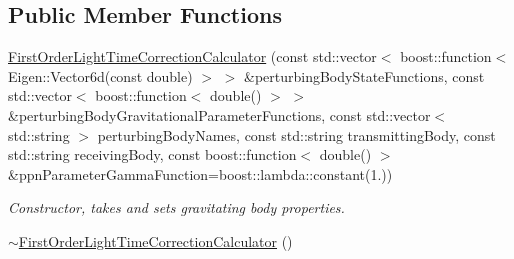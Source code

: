 \subsection*{Public Member Functions}
\begin{DoxyCompactItemize}
\item 
\hyperlink{classtudat_1_1observation__models_1_1FirstOrderLightTimeCorrectionCalculator_a36a8fae8864489b6084df060d9c8c87a}{First\+Order\+Light\+Time\+Correction\+Calculator} (const std\+::vector$<$ boost\+::function$<$ Eigen\+::\+Vector6d(const double) $>$ $>$ \&perturbing\+Body\+State\+Functions, const std\+::vector$<$ boost\+::function$<$ double() $>$ $>$ \&perturbing\+Body\+Gravitational\+Parameter\+Functions, const std\+::vector$<$ std\+::string $>$ perturbing\+Body\+Names, const std\+::string transmitting\+Body, const std\+::string receiving\+Body, const boost\+::function$<$ double() $>$ \&ppn\+Parameter\+Gamma\+Function=boost\+::lambda\+::constant(1.))
\begin{DoxyCompactList}\small\item\em Constructor, takes and sets gravitating body properties. \end{DoxyCompactList}\item 
\hyperlink{classtudat_1_1observation__models_1_1FirstOrderLightTimeCorrectionCalculator_a3e27fe74efe2902153ef21791fbb34ce}{$\sim$\+First\+Order\+Light\+Time\+Correction\+Calculator} ()\hypertarget{classtudat_1_1observation__models_1_1FirstOrderLightTimeCorrectionCalculator_a3e27fe74efe2902153ef21791fbb34ce}{}\label{classtudat_1_1observation__models_1_1FirstOrderLightTimeCorrectionCalculator_a3e27fe74efe2902153ef21791fbb34ce}


\end{DoxyCompactItemize}
